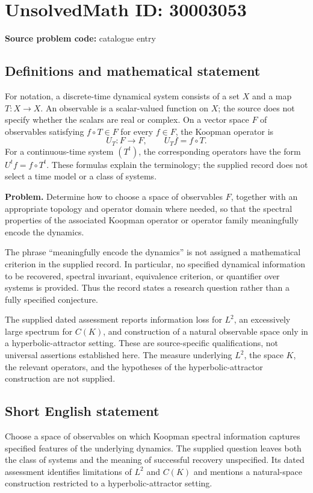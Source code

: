\documentclass[11pt]{article}
\begin{document}
\section*{UnsolvedMath ID: 30003053}
\textbf{Source problem code:} catalogue entry
\subsection{Definitions and mathematical statement}
For notation, a discrete-time dynamical system consists of a set \(X\) and a map \(T:X\to X\). An observable is a scalar-valued function on \(X\); the source does not specify whether the scalars are real or complex. On a vector space \(F\) of observables satisfying \(f\circ T\in F\) for every \(f\in F\), the Koopman operator is
\[
U_T:F\to F,\qquad U_Tf=f\circ T.
\]
For a continuous-time system \((T^t)\), the corresponding operators have the form \(U^tf=f\circ T^t\). These formulas explain the terminology; the supplied record does not select a time model or a class of systems.

\textbf{Problem.} Determine how to choose a space of observables \(F\), together with an appropriate topology and operator domain where needed, so that the spectral properties of the associated Koopman operator or operator family meaningfully encode the dynamics.

The phrase ``meaningfully encode the dynamics'' is not assigned a mathematical criterion in the supplied record. In particular, no specified dynamical information to be recovered, spectral invariant, equivalence criterion, or quantifier over systems is provided. Thus the record states a research question rather than a fully specified conjecture.

The supplied dated assessment reports information loss for \(L^2\), an excessively large spectrum for \(C(K)\), and construction of a natural observable space only in a hyperbolic-attractor setting. These are source-specific qualifications, not universal assertions established here. The measure underlying \(L^2\), the space \(K\), the relevant operators, and the hypotheses of the hyperbolic-attractor construction are not supplied.
\subsection{Short English statement}
Choose a space of observables on which Koopman spectral information captures specified features of the underlying dynamics. The supplied question leaves both the class of systems and the meaning of successful recovery unspecified. Its dated assessment identifies limitations of \(L^2\) and \(C(K)\) and mentions a natural-space construction restricted to a hyperbolic-attractor setting.
\end{document}
